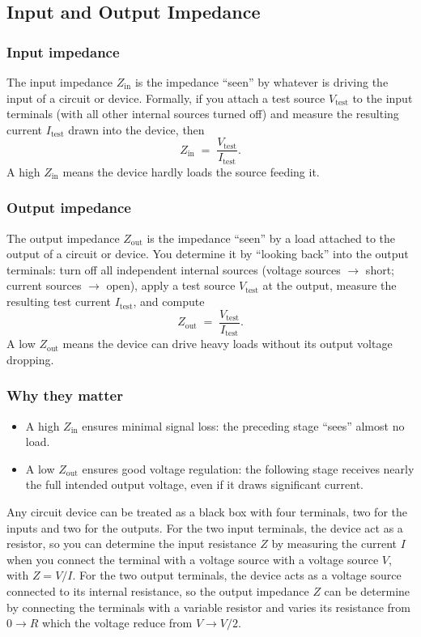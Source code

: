 \documentclass[english,a4paper,12pt]{report}
\begin{document}

\subsection{Input and Output Impedance}

\subsubsection{Input impedance}
The input impedance \(Z_{\mathrm{in}}\) is the impedance “seen” by whatever is driving the input of a circuit or device.  Formally, if you attach a test source \(V_{\mathrm{test}}\) to the input terminals (with all other internal sources turned off) and measure the resulting current \(I_{\mathrm{test}}\) drawn into the device, then
\[
Z_{\mathrm{in}}
\;=\;
\frac{V_{\mathrm{test}}}{I_{\mathrm{test}}}.
\]
A high \(Z_{\mathrm{in}}\) means the device hardly loads the source feeding it.

\subsubsection{Output impedance}
The output impedance \(Z_{\mathrm{out}}\) is the impedance “seen” by a load attached to the output of a circuit or device.  You determine it by “looking back” into the output terminals: turn off all independent internal sources (voltage sources \(\to\) short; current sources \(\to\) open), apply a test source \(V_{\mathrm{test}}\) at the output, measure the resulting test current \(I_{\mathrm{test}}\), and compute
\[
Z_{\mathrm{out}}
\;=\;
\frac{V_{\mathrm{test}}}{I_{\mathrm{test}}}.
\]
A low \(Z_{\mathrm{out}}\) means the device can drive heavy loads without its output voltage dropping.

\subsubsection{Why they matter}
\begin{itemize}
  \item A high \(Z_{\mathrm{in}}\) ensures minimal signal loss: the preceding stage “sees” almost no load.
  \item A low \(Z_{\mathrm{out}}\) ensures good voltage regulation: the following stage receives nearly the full intended output voltage, even if it draws significant current.
\end{itemize}

Any circuit device can be treated as a black box with four terminals, two for the inputs and two for the outputs. For the two input terminals, the device act as a resistor, so you can determine the input resistance \(Z\) by measuring the current \(I\) when you connect the terminal with a voltage source with a voltage source \(V\), with \(Z = V/I\). For the two output terminals, the device acts as a voltage source connected to its internal resistance, so the output impedance \(Z\) can be determine by connecting the terminals with a variable resistor and varies its resistance from \(0 \to R\) which the voltage reduce from \(V \to V/2\).   
\end{document}

